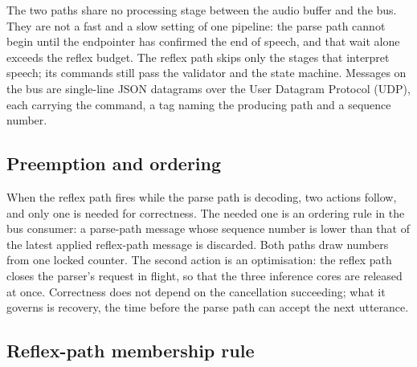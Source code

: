 \documentclass[a4paper,fleqn]{cas-dc}
\begin{document}
The two paths share no processing stage between the audio buffer and the bus. They are not a fast and a slow
setting of one pipeline: the parse path cannot begin until the endpointer has confirmed the end of
speech, and that wait alone exceeds the reflex budget. The reflex path skips only the stages that
interpret speech; its commands still pass the validator and the state machine. Messages on the bus
are single-line JSON datagrams over the User Datagram Protocol (UDP), each carrying the command, a tag naming the producing path
and a sequence number.

\subsection{Preemption and ordering}
\label{sec:preemption}

When the reflex path fires while the parse path is decoding, two actions follow, and only one is
needed for correctness. The needed one is an ordering rule in the bus consumer: a parse-path message
whose sequence number is lower than that of the latest applied reflex-path message is discarded.
Both paths draw numbers from one locked counter. 
The second action is an optimisation: the reflex path closes the parser's request in flight, so that
the three inference cores are released at once. Correctness does not depend on the cancellation
succeeding; what it governs is recovery, the time before the parse path can accept the next
utterance. 

\subsection{Reflex-path membership rule}
\label{sec:membership}
\end{document}
